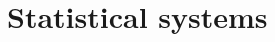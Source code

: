 \begin{comment}

\subsubsection{Experiments}
We found out it's not easy to automate translating with PC Translator. Its GUI is suited for translating by hand, sentence-by-sentence, but not for automated translation of thousands of sentences. Also, by definition, Windows GUI is harder to automate on Linux machine from a script.

However, we were able to work around that, with the help of VMWare Player virtualization software (\url{http://www.vmware.com/cz/products/player}) and Au\-to\-Hot\-key GUI scripting software, that allows us to emulate screen clicking (\url{http://www.autohotkey.com/}). Our workflow therefore is:

\begin{pitemize}
\item on Linux machine, encode the source from UTF-8 to windows-friendly encoding
\item encode the source as HTML code
\item start a virtual machine with PC Translator pre-installed
\item on the start of the virtual machine, run AutoHotkey script from an outer-machine folder (thanks to VMWare shared folders and Windows Startup scripts)
\item via this AutoHotkey script, run PC Translator and click on \uv{translate file} feature 
\item translate the HTML file (also shared in the VMWare shared folder)
\item turn off the virtual machine
\item turn the file back from HTML and Windows encodings back to UTF-8
\end{pitemize}

The HTML part is needed because PC Translator had some problems with translating ordinary text files, plus we can pair the translated sentences better thanks to \texttt{id} parameters in \texttt{div} tags.

We used the newest version of PC Translator available at the time, which is PC Translator v14.

\end{comment}

\section{Statistical systems}

